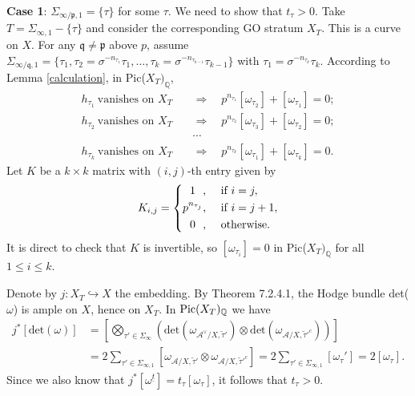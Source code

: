 \documentclass{article}
\begin{document}
\textbf{Case 1}: $\Sigma_{\infty/\mathfrak{p},1}=\{\tau\}$ for some $\tau$. We need to show that $t_{\tau}>0$. Take $T=\Sigma_{\infty,1}-\{\tau\}$ and consider the corresponding GO stratum $X_T$. This is a curve on $X$. For any $\mathfrak{q}\ne\mathfrak{p}$ above $p$, assume $\Sigma_{\infty/\mathfrak{q},1}=\{\tau_1,\tau_2=\sigma^{-n_{\tau_1}}\tau_1,\ldots,\tau_k=\sigma^{-n_{\tau_{k-1}}}\tau_{k-1}\}$ with $\tau_1=\sigma^{-n_{\tau_k}}\tau_k$. According to Lemma \ref{calculation}, in Pic($X_T)_{\mathbb{Q}}$,
\begin{equation}
\begin{aligned}
h_{\tau_1}\  \text{vanishes on $X_T$}\quad &\Rightarrow \quad p^{n_{\tau_1}}[\omega_{\tau_2}]+[\omega_{\tau_1}]=0;\\
h_{\tau_2}\  \text{vanishes on $X_T$}\quad &\Rightarrow \quad p^{n_{\tau_2}}[\omega_{\tau_3}]+[\omega_{\tau_2}]=0;\\
&\cdots\\
h_{\tau_k}\  \text{vanishes on $X_T$}\quad &\Rightarrow \quad p^{n_{\tau_k}}[\omega_{\tau_1}]+[\omega_{\tau_k}]=0.
\end{aligned}
\end{equation}
Let $K$ be a $k\times k$ matrix with $(i,j)$-th entry given by
\begin{equation}
	K_{i,j}=\left\{
	\begin{aligned}
		1\ \  ,\quad\  &\textnormal{if } i=j,\\
		p^{n_{\tau_j}},\ \quad &\textnormal{if } i=j+1,\\
		0\ \  ,\quad\  &\textnormal{otherwise}.
	\end{aligned}\right.
\end{equation}
It is direct to check that $K$ is invertible, so $[\omega_{\tau_i}]=0$ in Pic($X_T)_{\mathbb{Q}}$ for all $1\le i\le k$.

Denote by $j:X_T\hookrightarrow X$ the embedding. By \citep{Lan} Theorem 7.2.4.1, the Hodge bundle det($\omega$) is ample on $X$, hence on $X_T$. In $\textnormal{Pic}(X_T)_{\mathbb{Q}}$ we have
\begin{equation}
\begin{aligned}
j^\ast[\text{det}(\omega)]&=[\bigotimes_{\tau'\in\Sigma_{\infty}}(\text{det}(\omega_{\mathcal{A}^\vee/X,\tilde\tau'})\otimes\text{det}(\omega_{\mathcal{A}/X,\tilde\tau'^c}))]\\
&=2\sum_{\tau'\in\Sigma_{\infty,1}}[\omega_{\mathcal{A}/X,\tilde\tau'}\otimes \omega_{\mathcal{A}/X,\tilde\tau'^c}]=2\sum_{\tau'\in\Sigma_{\infty,1}}[\omega_\tau']=2[\omega_{\tau}].
\end{aligned}
\end{equation}
Since we also know that $j^\ast[\omega^{\underline{t}}]=t_{\tau}[\omega_{\tau}]$, it follows that $t_{\tau}>0$.
\end{document}
